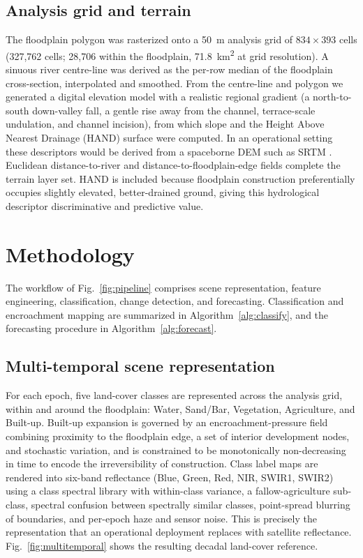 \documentclass[journal]{IEEEtran}
\begin{document}
\subsection{Analysis grid and terrain}
The floodplain polygon was rasterized onto a 50~m analysis grid of $834\times393$ cells (327{,}762 cells; 28{,}706 within the floodplain, 71.8~km\textsuperscript{2} at grid resolution). A sinuous river centre-line was derived as the per-row median of the floodplain cross-section, interpolated and smoothed. From the centre-line and polygon we generated a digital elevation model with a realistic regional gradient (a north-to-south down-valley fall, a gentle rise away from the channel, terrace-scale undulation, and channel incision), from which slope and the Height Above Nearest Drainage (HAND) surface \cite{renno2008hand,nobre2011height} were computed. In an operational setting these descriptors would be derived from a spaceborne DEM such as SRTM \cite{farr2007srtm}. Euclidean distance-to-river and distance-to-floodplain-edge fields complete the terrain layer set. HAND is included because floodplain construction preferentially occupies slightly elevated, better-drained ground, giving this hydrological descriptor discriminative and predictive value.

\section{Methodology}\label{sec:method}

The workflow of Fig.~\ref{fig:pipeline} comprises scene representation, feature engineering, classification, change detection, and forecasting. Classification and encroachment mapping are summarized in Algorithm~\ref{alg:classify}, and the forecasting procedure in Algorithm~\ref{alg:forecast}.


\subsection{Multi-temporal scene representation}
\label{sec:scene}
For each epoch, five land-cover classes are represented across the analysis grid, within and around the floodplain: Water, Sand/Bar, Vegetation, Agriculture, and Built-up. Built-up expansion is governed by an encroachment-pressure field combining proximity to the floodplain edge, a set of interior development nodes, and stochastic variation, and is constrained to be monotonically non-decreasing in time to encode the irreversibility of construction. Class label maps are rendered into six-band reflectance (Blue, Green, Red, NIR, SWIR1, SWIR2) using a class spectral library with within-class variance, a fallow-agriculture sub-class, spectral confusion between spectrally similar classes, point-spread blurring of boundaries, and per-epoch haze and sensor noise. This is precisely the representation that an operational deployment replaces with satellite reflectance. Fig.~\ref{fig:multitemporal} shows the resulting decadal land-cover reference.
\end{document}
